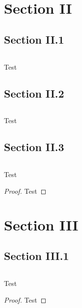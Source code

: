 \documentclass[notheorems, compress]{beamer}
\begin{document}
\section{Section II}

\subsection{Section II.1}
\begin{frame}{$ $}
    \begin{problem}[Test]\label{prob:Test}
        Test
    \end{problem}
\end{frame}

\subsection{Section II.2}
\begin{frame}{$ $}
    \begin{solution}[Test]\label{sol:Test}
        Test
    \end{solution}
\end{frame}

\subsection{Section II.3}
\begin{frame}{$ $}
    \begin{theorem}[Test]\label{thm:Test}
        Test
    \end{theorem}
    \begin{proof}
        Test
    \end{proof}
\end{frame}

\section{Section III}

\subsection{Section III.1}
\begin{frame}{$ $}
    \begin{proposition}[Test]\label{prop:Test}
        Test
    \end{proposition}
    \begin{proof}
        Test
    \end{proof}
\end{frame}
\end{document}

